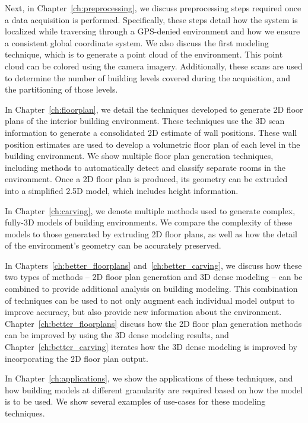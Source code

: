 \documentclass[12pt,onecolumn,oneside]{book}
\begin{document}
Next, in Chapter~\ref{ch:preprocessing}, we discuss preprocessing steps required once a data acquisition is performed.  Specifically, these steps detail how the system is localized while traversing through a GPS-denied environment and how we ensure a consistent global coordinate system.  We also discuss the first modeling technique, which is to generate a point cloud of the environment.  This point cloud can be colored using the camera imagery.  Additionally, these scans are used to determine the number of building levels covered during the acquisition, and the partitioning of those levels.

In Chapter~\ref{ch:floorplan}, we detail the techniques developed to generate 2D floor plans of the interior building environment.  These techniques use the 3D scan information to generate a consolidated 2D estimate of wall positions.  These wall position estimates are used to develop a volumetric floor plan of each level in the building environment.  We show multiple floor plan generation techniques, including methods to automatically detect and classify separate rooms in the environment.  Once a 2D floor plan is produced, its geometry can be extruded into a simplified 2.5D model, which includes height information.

In Chapter~\ref{ch:carving}, we denote multiple methods used to generate complex, fully-3D models of building environments.  We compare the complexity of these models to those generated by extruding 2D floor plans, as well as how the detail of the environment's geometry can be accurately preserved.

In Chapters~\ref{ch:better_floorplans} and~\ref{ch:better_carving}, we discuss how these two types of methods -- 2D floor plan generation and 3D dense modeling -- can be combined to provide additional analysis on building modeling.  This combination of techniques can be used to not only augment each individual model output to improve accuracy, but also provide new information about the environment.  Chapter~\ref{ch:better_floorplans} discuss how the 2D floor plan generation methods can be improved by using the 3D dense modeling results, and Chapter~\ref{ch:better_carving} iterates how the 3D dense modeling is improved by incorporating the 2D floor plan output.

In Chapter~\ref{ch:applications}, we show the applications of these techniques, and how building models at different granularity are required based on how the model is to be used.  We show several examples of use-cases for these modeling techniques.
\end{document}
